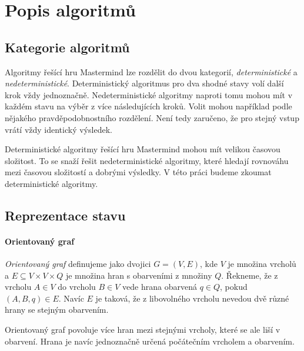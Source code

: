 \chapter{Popis algoritmů}
\section{Kategorie algoritmů}
Algoritmy řešící hru Mastermind lze rozdělit do dvou kategorií, \emph{deterministické} a \emph{nedeterministické}. Deterministický algoritmus pro dva shodné stavy volí další krok vždy jednoznačně. 
Nedeterministické algoritmy naproti tomu mohou mít v každém stavu na výběr z více následujících kroků. Volit mohou například podle nějakého pravděpodobnostního rozdělení. Není tedy zaručeno, že pro stejný vstup vrátí vždy identický výsledek.

Deterministické algoritmy řešící hru Mastermind mohou mít velikou časovou složitost. To se snaží řešit nedeterministické algoritmy, které hledají rovnováhu mezi časovou složitostí a dobrými výsledky. 
V této práci budeme zkoumat deterministické algoritmy. 


\section{Reprezentace stavu}


\subsubsection{Orientovaný graf}

\begin{definice}
    \emph{Orientovaný graf} definujeme jako dvojici $G = (V,E)$, kde $V$ je množina vrcholů a $E \subseteq V\times V \times Q$ je množina hran s obarveními z množiny $Q$. 
    Řekneme, že z vrcholu $A \in V$ do vrcholu $B \in V$ vede hrana obarvená $q \in Q$, pokud $(A,B,q) \in E$. Navíc $E$ je taková, že z libovolného vrcholu nevedou dvě různé hrany se stejným obarvením.
\end{definice}
\begin{pozn}
    Orientovaný graf povoluje více hran mezi stejnými vrcholy, které se ale liší v obarvení. Hrana je navíc jednoznačně určená počátečním vrcholem a obarvením.
\end{pozn}


